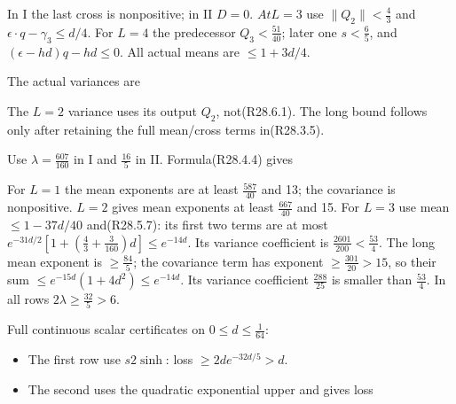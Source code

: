 In I the last cross is nonpositive; in II \(D=0\). \(At L=3\) use \(\lVert Q_{2}\rVert <\frac{4}{3}\) and \(\epsilon\cdot q-\gamma_{3}\le d/4\). For \(L=4\) the predecessor \(Q_{3}<\frac{51}{40}\); later one \(s<\frac{6}{5}\), and \((\epsilon-hd)q-hd\le 0\). All actual means are \(\le 1+3d/4\).

The actual variances are


The \(L=2\) variance uses its output \(Q_{2}\), not(R28.6.1). The long bound follows only after retaining the full mean/cross terms in(R28.3.5).

Use \(\lambda=\frac{607}{160}\) in I and \(\frac{16}{5}\) in II. Formula(R28.4.4) gives


For \(L=1\) the mean exponents are at least \(\frac{587}{40}\) and 13; the covariance is nonpositive. \(L=2\) gives mean exponents at least \(\frac{667}{40}\) and 15. For \(L=3\) use mean \(\le 1-37d/40\) and(R28.5.7): its first two terms are at most \(e^{-31d/2}[1+(\frac{4}{3}+\frac{3}{160})d]\le e^{-14d}\). Its variance coefficient is \(\frac{2601}{200}<\frac{53}{4}\). The long mean exponent is \(\ge \frac{84}{5}\); the covariance term has exponent \(\ge \frac{301}{20}>15\), so their sum \(\le e^{-15d}(1+4d^2)\le e^{-14d}\). Its variance coefficient \(\frac{288}{25}\) is smaller than \(\frac{53}{4}\). In all rows \(2\lambda\ge \frac{32}{5}>6\).

Full continuous scalar certificates on \(0\le d\le \frac{1}{64}\):

\begin{itemize}
\item The first row use \(s2\sinh\): loss \(\ge 2d e^{-32d/5}>d\).
\item The second uses the quadratic exponential upper and gives loss
\end{itemize}

